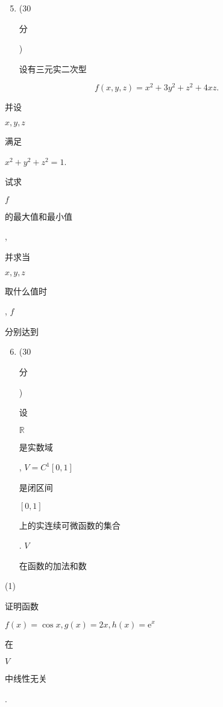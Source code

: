 \documentclass[10pt]{article}
\begin{document}
\begin{enumerate}
  \setcounter{enumi}{4}
  \item (30 \begin{CJK}{UTF8}{mj}分\end{CJK}) \begin{CJK}{UTF8}{mj}设有三元实二次型\end{CJK}
\end{enumerate}
$$
f(x, y, z)=x^{2}+3 y^{2}+z^{2}+4 x z .
$$
\begin{CJK}{UTF8}{mj}并设\end{CJK} $x, y, z$ \begin{CJK}{UTF8}{mj}满足\end{CJK} $x^{2}+y^{2}+z^{2}=1$. \begin{CJK}{UTF8}{mj}试求\end{CJK} $f$ \begin{CJK}{UTF8}{mj}的最大值和最小值\end{CJK}, \begin{CJK}{UTF8}{mj}并求当\end{CJK} $x, y, z$ \begin{CJK}{UTF8}{mj}取什么值时\end{CJK}, $f$ \begin{CJK}{UTF8}{mj}分别达到\end{CJK}

\begin{enumerate}
  \setcounter{enumi}{5}
  \item (30 \begin{CJK}{UTF8}{mj}分\end{CJK}) \begin{CJK}{UTF8}{mj}设\end{CJK} $\mathbb{R}$ \begin{CJK}{UTF8}{mj}是实数域\end{CJK}, $V=C^{1}[0,1]$ \begin{CJK}{UTF8}{mj}是闭区间\end{CJK} $[0,1]$ \begin{CJK}{UTF8}{mj}上的实连续可微函数的集合\end{CJK}. $V$ \begin{CJK}{UTF8}{mj}在函数的加法和数\end{CJK}
\end{enumerate}
(1) \begin{CJK}{UTF8}{mj}证明函数\end{CJK} $f(x)=\cos x, g(x)=2 x, h(x)=\mathrm{e}^{x}$ \begin{CJK}{UTF8}{mj}在\end{CJK} $V$ \begin{CJK}{UTF8}{mj}中线性无关\end{CJK}.
\end{document}
